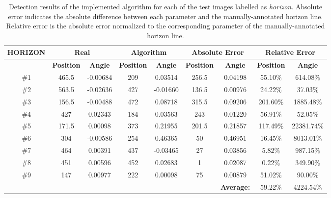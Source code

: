 \begin{table}[htbp]
	\footnotesize
\begin{center}
\begin{tabular}{ccccccccc}
\hline
\textbf{HORIZON} & \multicolumn{ 2}{c}{\textbf{Real}} & \multicolumn{ 2}{c}{\textbf{Algorithm}} & \multicolumn{ 2}{c}{\textbf{Absolute Error}} & \multicolumn{ 2}{c}{\textbf{Relative Error}} \\ \hline
 & \textbf{Position} & \textbf{Angle} & \textbf{Position} & \textbf{Angle} & \textbf{Position} & \textbf{Angle} & \textbf{Position} & \textbf{Angle} \\ \hline
\#1 & 465.5 & -0.00684 & 209 & 0.03514 & 256.5 & 0.04198 & 55.10\% & 614.08\% \\ 
\#2 & 563.5 & -0.02636 & 427 & -0.01660 & 136.5 & 0.00976 & 24.22\% & 37.03\% \\ 
\#3 & 156.5 & -0.00488 & 472 & 0.08718 & 315.5 & 0.09206 & 201.60\% & 1885.48\% \\ 
\#4 & 427 & 0.02343 & 184 & 0.03563 & 243 & 0.01220 & 56.91\% & 52.05\% \\ 
\#5 & 171.5 & 0.00098 & 373 & 0.21955 & 201.5 & 0.21857 & 117.49\% & 22381.74\% \\ 
\#6 & 304 & -0.00586 & 254 & 0.46365 & 50 & 0.46951 & 16.45\% & 8013.01\% \\ 
\#7 & 464 & 0.00391 & 437 & -0.03465 & 27 & 0.03856 & 5.82\% & 987.15\% \\ 
\#8 & 451 & 0.00596 & 452 & 0.02683 & 1 & 0.02087 & 0.22\% & 349.90\% \\ 
\#9 & 147 & 0.00977 & 222 & 0.00098 & 75 & 0.00879 & 51.02\% & 90.00\% \\ \hline
\multicolumn{1}{l}{} & \multicolumn{1}{l}{} & \multicolumn{1}{l}{} & \multicolumn{1}{l}{} & \multicolumn{1}{l}{} & \multicolumn{1}{l}{} & \textbf{Average:} & 59.22\% & 4224.54\% \\ \hline
\end{tabular}
\end{center}
\caption{Detection results of the implemented algorithm for each of the test images labelled as \emph{horizon}. Absolute error indicates the absolute difference between each parameter and the manually-annotated horizon line. Relative error is the absolute error normalized to the corresponding parameter of the manually-annotated horizon line.}
\label{tab:hor_tab}
\end{table}

